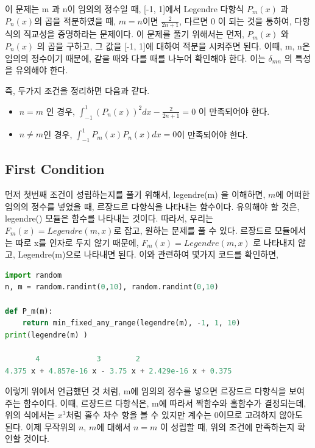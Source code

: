 \documentclass[11pt]{article}
\begin{document}
이 문제는 m 과 n이 임의의 정수일 때, [-1, 1]에서 Legendre 다항식 $P_m(x)$ 과 $P_n(x)$의 곱을 적분하였을 때, $m = n$이면 $\frac{2}{2n + 1}$, 다르면 $0$ 이 되는 것을 통하여, 다항식의 직교성을 증명하라는 문제이다. 이 문제를 풀기 위해서는 먼저, $P_m(x)$ 와  $P_n(x)$ 의 곱을 구하고, 그 값을 [-1, 1]에 대하여 적분을 시켜주면 된다. 이때, m, n은 임의의 정수이기 때문에, 같을 때와 다를 때를 나누어 확인해야 한다. 이는  $\delta_{mn}$ 의 특성을 유의해야 한다.

즉, 두가지 조건을 정리하면 다음과 같다.
\begin{itemize}
\item $n = m$ 인 경우,  $\int_{-1}^1 (P_n(x))^2 dx - \frac{2}{2n + 1}  = 0 $ 이 만족되어야 한다.
\item $n \neq m$인 경우, $\int_{-1}^1 P_m(x) P_n(x) dx = 0 $이 만족되어야 한다.
\end{itemize}

\subsection{First Condition} 
먼저 첫번째 조건이 성립하는지를 풀기 위해서, legendre(m) 을 이해하면, $m$에 어떠한 임의의 정수를 넣었을 때, 르장드르 다항식을 나타내는 함수이다. 유의해야 할 것은, legendre() 모듈은 함수를 나타내는 것이다. 따라서, 우리는 $F_m(x) = Legendre(m, x)$로 잡고, 원하는 문제를 풀 수 있다. 르장드르 모듈에서는 따로 x를 인자로 두지 않기 때문에, $F_m(x) = Legendre(m, x)$ 로 나타내지 않고, Legendre(m)으로 나타내면 된다. 이와 관련하여 몇가지 코드를 확인하면,
\begin{lstlisting}[language=Python]
import random
n, m = random.randint(0,10), random.randint(0,10)

def P_m(m): 
    return min_fixed_any_range(legendre(m), -1, 1, 10)
print(legendre(m) )

       4             3        2
4.375 x + 4.857e-16 x - 3.75 x + 2.429e-16 x + 0.375
        \end{lstlisting}
이렇게 위에서 언급했던 것 처럼, m에 임의의 정수를 넣으면 르장드르 다항식을 보여주는 함수이다. 이때, 르장드르 다항식은, m에 따라서 짝함수와 홀함수가 결정되는데, 위의 식에서는 $x^3$처럼 홀수 차수 항을 볼 수 있지만 계수는 0이므로 고려하지 않아도 된다. 이제 무작위의 $n$, $m$에 대해서 $n = m$ 이 성립할 때, 위의 조건에 만족하는지 확인할 것이다.
\end{document}
